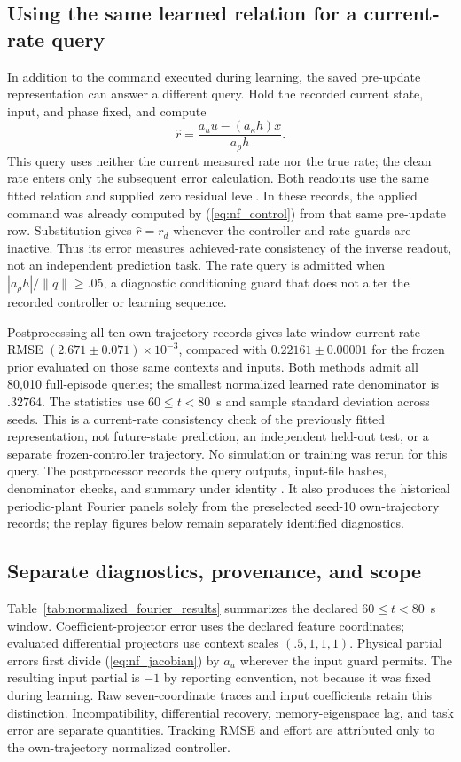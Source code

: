 \documentclass[journal]{IEEEtran}
\begin{document}
\subsection{Using the same learned relation for a current-rate query}
In addition to the command executed during learning, the saved pre-update
representation can answer a different query. Hold the recorded current
state, input, and phase fixed, and compute
\begin{equation}
 \widehat r=\frac{a_u u-(a_\kappa h)x}{a_\rho h}.
 \label{eq:nf_rate_completion}
\end{equation}
This query uses neither the current measured rate nor the true rate; the
clean rate enters only the subsequent error calculation. Both readouts use
the same fitted relation and supplied zero residual level. In these records,
the applied command was already computed by (\ref{eq:nf_control}) from
that same pre-update row. Substitution gives $\widehat r=r_d$ whenever
the controller and rate guards are inactive. Thus its error measures
achieved-rate consistency of the inverse readout, not an independent
prediction task. The rate query
is admitted when $|a_\rho h|/\|q\|\ge .05$, a diagnostic conditioning
guard that does not alter the recorded controller or learning sequence.

Postprocessing all ten own-trajectory records gives late-window current-rate
RMSE $(2.671\pm0.071)\times10^{-3}$, compared with
$0.22161\pm0.00001$ for the frozen prior evaluated on those same contexts
and inputs. Both methods admit all 80,010 full-episode queries; the smallest
normalized learned rate denominator is $.32764$. The statistics use
$60\le t<80$~s and sample standard deviation across seeds. This is
a current-rate consistency check of the previously fitted representation,
not future-state prediction, an independent held-out test, or a separate
frozen-controller trajectory. No simulation or training was rerun for this
query. The postprocessor 
records the query outputs, input-file hashes, denominator checks, and summary
under identity .
It also produces the historical periodic-plant Fourier panels solely from the
preselected seed-10 own-trajectory records; the replay figures below remain
separately identified diagnostics.

\subsection{Separate diagnostics, provenance, and scope}
Table~\ref{tab:normalized_fourier_results} summarizes the declared
$60\le t<80$~s window. Coefficient-projector error uses the declared feature
coordinates; evaluated differential projectors use context scales
$(.5,1,1,1)$. Physical partial errors first divide (\ref{eq:nf_jacobian})
by $a_u$ wherever the input guard permits. The resulting input partial is
$-1$ by reporting convention, not because it was fixed during learning.
Raw seven-coordinate traces and input coefficients retain this distinction.
Incompatibility, differential recovery, memory-eigenspace lag, and task error
are separate quantities. Tracking RMSE and effort are attributed only to the
own-trajectory normalized controller.
\end{document}
